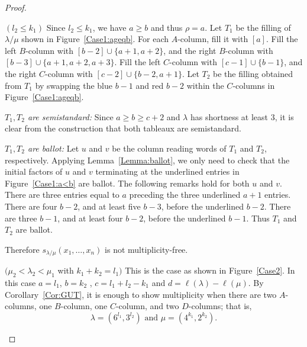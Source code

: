 \begin{proof}
\begin{Case}
\end{Case}

\begin{Case}
{ $(l_2 \leq k_1)$} 
Since $l_2 \leq k_1$, we have $a\geq b$ and thus $\rho = a$. Let $T_1$ be the filling of $\lambda/\mu$ shown in Figure~\ref{Case1:ageqb}. For each $A$-column, fill it with $[a]$. Fill the left $B$-column with $[b-2]\cup \{a+1,a+2\}$, and the right $B$-column with $[b-3]\cup \{a+1,a+2,a+3\}$. Fill the left $C$-column with $[c-1]\cup \{b-1\}$, and the right $C$-column with $[c-2]\cup \{b-2,a+1\}$. Let $T_2$ be the filling obtained from $T_1$ by swapping the blue $b-1$ and red $b-2$ within the $C$-columns in Figure~\ref{Case1:ageqb}.

\emph{$T_1,T_2$ are semistandard:} Since $a \geq b \geq c+2$ and $\lambda$ has shortness at least $3$, it is clear from the construction that both tableaux are semistandard. 

\emph{$T_1,T_2$ are ballot:} Let $u$ and $v$ be the column reading words of $T_1$ and $T_2$, respectively. Applying Lemma~\ref{Lemma:ballot}, we only need to check that the initial factors of $u$ and $v$ terminating at the underlined entries in Figure~\ref{Case1:a<b} are ballot. The following remarks hold for both $u$ and $v$. There are three entries equal to $a$ preceding the three underlined $a+1$ entries. There are four $b-2$, and at least five $b-3$, before the underlined $b-2$. There are three $b-1$, and at least four $b-2$, before the underlined $b-1$. Thus $T_1$ and $T_2$ are ballot.

Therefore $s_{\lambda/\mu}(x_1,\ldots,x_{n})$ is not multiplicity-free.
\end{Case}

\begin{Case}
{ $(\mu_2 < \lambda_2 < \mu_1$ with $k_1+k_2 = l_1)$} 
This is the case as shown in Figure~\ref{Case2}. In this case $a = l_1$, $b = k_2$ , $c = l_1+l_2-k_1$ and $d= \ell(\lambda) - \ell(\mu)$. By Corollary~\ref{Cor:GUT}, it is enough to show multiplicity when there are two $A$-columns, one $B$-column, one $C$-column, and two $D$-columns; that is, 
\[
 \lambda = (6^{l_1},3^{l_2})\text{ and } \mu=(4^{k_1},2^{k_2}). 
\]

\begin{figure}[htb]\centering
\end{figure}
\end{Case}
\end{proof}
